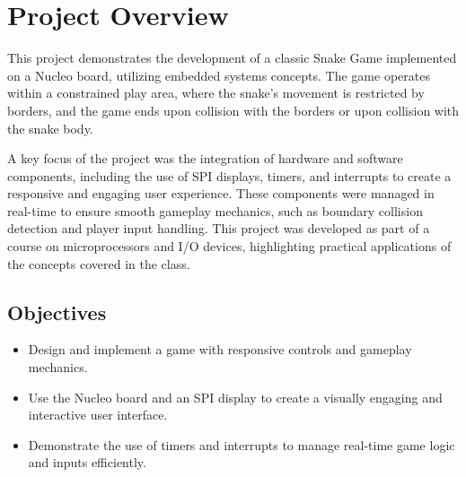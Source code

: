 \section{Project Overview}
\label{sec:objectives} %

This project demonstrates the development of a classic Snake Game implemented on a Nucleo board, utilizing embedded systems concepts. The game operates within a constrained play area, where the snake's movement is restricted by borders, and the game ends upon collision with the borders or upon collision with the snake body.

A key focus of the project was the integration of hardware and software components, including the use of SPI displays, timers, and interrupts to create a responsive and engaging user experience. These components were managed in real-time to ensure smooth gameplay mechanics, such as boundary collision detection and player input handling. This project was developed as part of a course on microprocessors and I/O devices, highlighting practical applications of the concepts covered in the class. 

\subsection{Objectives}

\begin{itemize}
    \item Design and implement a game with responsive controls and gameplay mechanics.
    \item Use the Nucleo board and an SPI display to create a visually engaging and interactive user interface.
    \item Demonstrate the use of timers and interrupts to manage real-time game logic and inputs efficiently.
  
\end{itemize}
